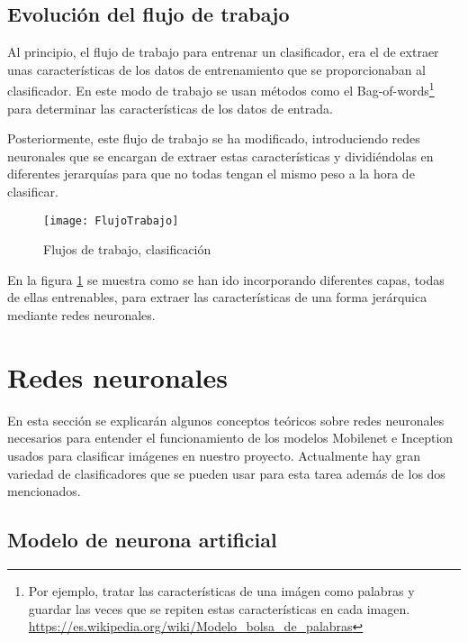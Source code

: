 \subsection{Evolución del flujo de trabajo}

Al principio, el flujo de trabajo para entrenar un clasificador, era el de extraer unas características de los datos de entrenamiento que se proporcionaban al clasificador. En este modo de trabajo se usan métodos como el Bag-of-words\footnote{Por ejemplo, tratar las características de una imágen como palabras y guardar las veces que se repiten estas características en cada imagen. \url{https://es.wikipedia.org/wiki/Modelo_bolsa_de_palabras}} para determinar las características de los datos de entrada.

Posteriormente, este flujo de trabajo se ha modificado, introduciendo redes neuronales que se encargan de extraer estas características y dividiéndolas en diferentes jerarquías para que no todas tengan el mismo peso a la hora de clasificar.

\begin{figure}[h]
    \begin{center}%
        \begin{center}%
          \texttt{[image: FlujoTrabajo]}%
          \caption{Flujos de trabajo, clasificación}%
          \label{figFlujo}%
        \end{center}%
  	\end{center}%
\end{figure}%

En la figura \ref{figFlujo} se muestra como se han ido incorporando diferentes capas, todas de ellas entrenables, para extraer las características de una forma jerárquica mediante redes neuronales.

\newpage

\section{Redes neuronales}

En esta sección se explicarán algunos conceptos teóricos sobre redes neuronales necesarios para entender el funcionamiento de los modelos Mobilenet e Inception usados para clasificar imágenes en nuestro proyecto. Actualmente hay gran variedad de clasificadores que se pueden usar para esta tarea además de los dos mencionados.

\subsection{Modelo de neurona artificial}

